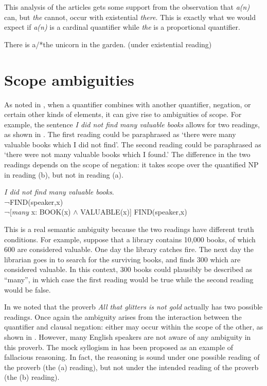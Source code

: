 This analysis of the articles gets some support from the observation that \textit{a(n)} can, but \textit{the} cannot, occur with existential \textit{there}. This is exactly what we would expect if \textit{a(n)} is a cardinal quantifier while \textit{the} is a proportional quantifier.


\ea \label{ex:14.30}
  There is a/*the unicorn in the garden.  (under existential reading)
\z

\section{Scope ambiguities}\label{sec:14.5}

As noted in , when a quantifier combines with another quantifier, negation, or certain other kinds of elements, it can give rise to ambiguities of scope. For example, the sentence \textit{I did not find many valuable books} allows for two readings, as shown in . The first reading could be paraphrased as ‘there were many valuable books which I did not find’. The second reading could be paraphrased as ‘there were not many valuable books which I found.’ The difference in the two readings depends on the scope of negation: it takes scope over the quantified NP in reading (b), but not in reading (a).


\ea \label{ex:14.31}
\textit{I did not find many valuable books}.\\
 ¬FIND(speaker,x)\\
\ex  ¬[\textit{many} x: BOOK(x) $\wedge$ VALUABLE(x)] FIND(speaker,x)
                       \z
\z


This is a real semantic ambiguity because the two readings have different truth conditions. For example, suppose that a library contains 10,000 books, of which 600 are considered valuable. One day the library catches fire. The next day the librarian goes in to search for the surviving books, and finds 300 which are considered valuable. In this context, 300 books could plausibly be described as “many”, in which case the first reading would be true while the second reading would be false.



In  we noted that the proverb \textit{All that glitters is not gold} actually has two possible readings. Once again the ambiguity arises from the interaction between the quantifier and clausal negation: either may occur within the scope of the other, as shown in . However, many English speakers are not aware of any ambiguity in this proverb. The mock syllogism in  has been proposed as an example of fallacious reasoning. In fact, the reasoning is sound under one possible reading of the proverb (the (a) reading), but not under the intended reading of the proverb (the (b) reading).


